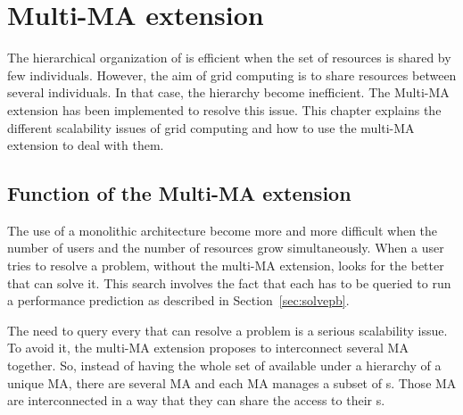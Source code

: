 \chapter{Multi-MA extension}
\label{ch:multiMAextension}

The hierarchical organization of \diet is efficient when the set of
resources is shared by few individuals. However, the aim of grid
computing is to share resources between several individuals. In that
case, the \diet hierarchy become inefficient. The Multi-MA extension
has been implemented to resolve this issue. This chapter explains the
different scalability issues of grid computing and how to use the
multi-MA extension to deal with them.

\section{Function of the Multi-MA extension}

The use of a monolithic architecture become more and more difficult
when the number of users and the number of resources grow
simultaneously. When a user tries to resolve a problem, without the
multi-MA extension, \diet looks for the better \sed that can solve
it. This search involves the fact that each \sed has to be queried to
run a performance prediction as described in Section~\ref{sec:solvepb}.

The need to query every \sed that can resolve a problem is a serious
scalability issue. To avoid it, the multi-MA extension proposes to
interconnect several MA together. So, instead of having the whole set
of \sed available under a hierarchy of a unique MA, there are several
MA and each MA manages a subset of {\sed}s. Those MA are
interconnected in a way that they can share the access to their
{\sed}s.

